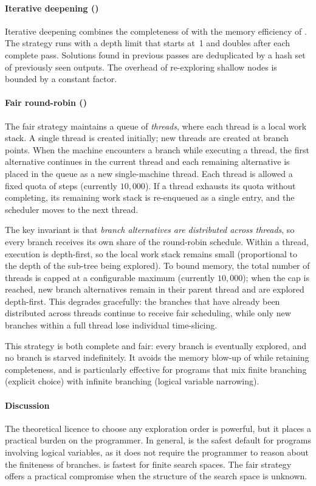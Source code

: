 \paragraph{Iterative deepening (\IDDFS{})}
Iterative deepening combines the completeness of \BFS{} with the memory
efficiency of \DFS{}. The strategy runs \DFS{} with a depth limit that starts
at~1 and doubles after each complete pass. Solutions found in previous passes
are deduplicated by a hash set of previously seen outputs. The overhead of
re-exploring shallow nodes is bounded by a constant factor.

\paragraph{Fair round-robin (\Fair{})}
The fair strategy maintains a queue of \emph{threads}, where each thread is a
local \DFS{} work stack. A single thread is created initially; new threads are
created at branch points. When the machine encounters a branch while executing a
thread, the first alternative continues in the current thread and each remaining
alternative is placed in the queue as a new single-machine thread. Each thread
is allowed a fixed quota of steps (currently $10{,}000$). If a thread exhausts
its quota without completing, its remaining work stack is re-enqueued as a
single entry, and the scheduler moves to the next thread.

The key invariant is that \emph{branch alternatives are distributed across
threads}, so every branch receives its own share of the round-robin schedule.
Within a thread, execution is depth-first, so the local work stack remains
small (proportional to the depth of the sub-tree being explored). To bound
memory, the total number of threads is capped at a configurable maximum
(currently $10{,}000$); when the cap is reached, new branch alternatives remain
in their parent thread and are explored depth-first. This degrades gracefully:
the branches that have already been distributed across threads continue to
receive fair scheduling, while only new branches within a full thread lose
individual time-slicing.

This strategy is both complete and fair: every branch is eventually explored,
and no branch is starved indefinitely. It avoids the memory blow-up of \BFS{}
while retaining completeness, and is particularly effective for programs that
mix finite branching (explicit choice) with infinite branching (logical variable
narrowing).

\paragraph{Discussion}
The theoretical licence to choose any exploration order is powerful, but it
places a practical burden on the programmer. In general, \BFS{} is the safest
default for programs involving logical variables, as it does not require the
programmer to reason about the finiteness of branches. \DFS{} is fastest for
finite search spaces. The fair strategy offers a practical compromise when the
structure of the search space is unknown.
